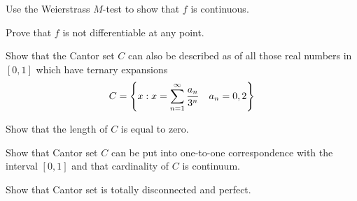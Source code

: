 \documentclass{../homework}
\begin{document}
\begin{problems}
\begin{problems}
  \item Use the Weierstrass \(M\)-test to show that \(f\) is
    continuous.

    \begin{solution}
    \end{solution}

  \item Prove that \(f\) is not differentiable at any point.

    \begin{solution}
    \end{solution}
  \end{problems}

\item
  \begin{problems}
  \item Show that the Cantor set \(C\) can also be described as of all
    those real numbers in \([0, 1]\) which have ternary expansions
    \[
      C = \left\{
        x : x = \sum_{n=1}^\infty \frac{a_n}{3^n}
        \quad a_n = 0, 2
      \right\}
    \]

    \begin{solution}
    \end{solution}

  \item Show that the length of \(C\) is equal to zero.

    \begin{solution}
    \end{solution}

  \item Show that Cantor set \(C\) can be put into one-to-one
    correspondence with the interval \([0, 1]\) and that cardinality
    of \(C\) is continuum.

    \begin{solution}
    \end{solution}

  \item Show that Cantor set is totally disconnected and perfect.

    \begin{solution}
    \end{solution}
  \end{problems}
\end{problems}
\end{document}
